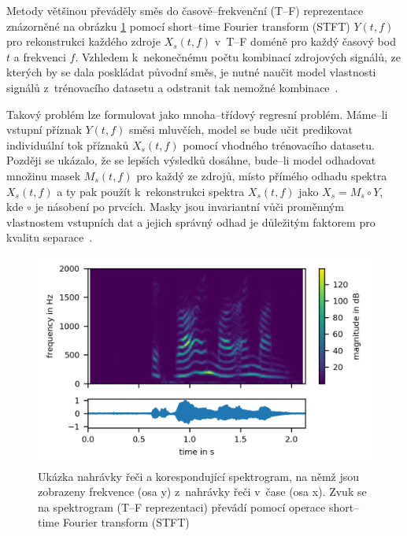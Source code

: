 Metody většinou převáděly směs do časově--frekvenční (T--F) reprezentace znázorněné na obrázku \ref{fig:spektrum} pomocí short--time Fourier transform (STFT) $Y(t,f)$ pro rekonstrukci každého zdroje $X_s(t,f)$ v~T--F doméně pro každý časový bod $t$ a frekvenci $f$. Vzhledem k~nekonečnému počtu kombinací zdrojových signálů, ze kterých by se dala poskládat původní směs, je nutné naučit model vlastnosti signálů z~trénovacího datasetu a odstranit tak nemožné kombinace~\cite{cocktailparty}.

Takový problém lze formulovat jako mnoha--třídový regresní problém. Máme--li vstupní příznak $Y(t,f)$ směsi mluvčích, model se bude učit predikovat individuální tok příznaků $X_s(t,f)$ pomocí vhodného trénovacího datasetu. Později se ukázalo, že se lepších výsledků dosáhne, bude--li model odhadovat množinu masek $M_s(t,f)$ pro každý ze zdrojů, místo přímého odhadu spektra $X_s(t,f)$ a ty pak použít k~rekonstrukci spektra $X_s(t,f)$ jako $X_s = M_s \circ Y$, kde $\circ$ je násobení po prvcích. Masky jsou invariantní vůči proměnným vlastnostem vstupních dat a jejich správný odhad je důležitým faktorem pro kvalitu separace~\cite{cocktailparty}.


\begin{figure}[H]
    \centering
    \includegraphics[scale=1.0]{obrazky-figures/spektrum.png}
    \caption{\label{fig:spektrum}Ukázka nahrávky řeči a korespondující spektrogram, na němž jsou zobrazeny frekvence (osa y) z~nahrávky řeči v~čase (osa x). Zvuk se na spektrogram (T--F reprezentaci) převádí pomocí operace short--time Fourier transform (STFT)}
\end{figure}


